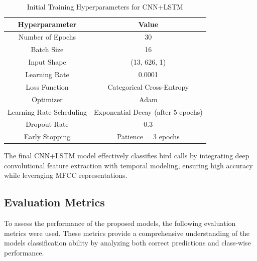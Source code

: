 \begin{itemize}
            \begin{table}[h]
            \centering
            \caption{Initial Training Hyperparameters for CNN+LSTM}
            \label{tab:training_hyperparameters_cnnlstm}
            \begin{tabular}{|c|c|}
                  \hline
                  \textbf{Hyperparameter} & \textbf{Value} \\
                  \hline
                  Number of Epochs & 30 \\
                  \hline
                  Batch Size & 16 \\
                  \hline
                  Input Shape & (13, 626, 1) \\
                  \hline
                  Learning Rate & 0.0001 \\
                  \hline
                  Loss Function & Categorical Cross-Entropy \\
                  \hline
                  Optimizer & Adam \\
                  \hline
                  Learning Rate Scheduling & Exponential Decay (after 5 epochs) \\
                  \hline
                  Dropout Rate & 0.3 \\
                  \hline
                  Early Stopping & Patience = 3 epochs \\
                  \hline
            \end{tabular}
            \end{table}

            The final CNN+LSTM model effectively classifies bird calls by integrating deep convolutional feature extraction with temporal modeling, ensuring high accuracy while leveraging MFCC representations.

      \end{itemize}
        
      
    \subsection{Evaluation Metrics}
        To assess the performance of the proposed models, the following evaluation metrics were used. These metrics provide a comprehensive understanding of the models classification ability by analyzing both correct predictions and class-wise performance.
        
